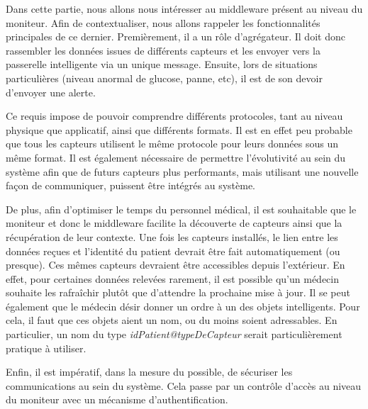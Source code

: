 Dans cette partie, nous allons nous intéresser au middleware présent au niveau du moniteur. Afin de contextualiser, nous allons
rappeler les fonctionnalités principales de ce dernier. Premièrement, il a un rôle d'agrégateur. Il doit donc rassembler les
données issues de différents capteurs et les envoyer vers la passerelle intelligente via un unique message. Ensuite, lors de
situations particulières (niveau anormal de glucose, panne, etc), il est de son devoir d'envoyer une alerte. 
\newline

Ce requis impose de pouvoir comprendre différents protocoles, tant au niveau physique que applicatif, ainsi que différents
formats. Il est en effet peu probable que tous les capteurs utilisent le même protocole pour leurs données sous un même format. Il
est également nécessaire de permettre l'évolutivité au sein du système afin que de futurs capteurs plus performants, mais
utilisant une nouvelle façon de communiquer, puissent être intégrés au système.
\newline

De plus, afin d'optimiser le temps du personnel médical, il est souhaitable que le moniteur et donc le middleware facilite la
découverte de capteurs ainsi que la récupération de leur contexte. Une fois les capteurs installés, le lien entre les données
reçues et l'identité du patient devrait être fait automatiquement (ou presque). Ces mêmes capteurs devraient être accessibles
depuis l'extérieur. En effet, pour certaines données relevées rarement, il est possible qu'un médecin souhaite les rafraîchir
plutôt que d'attendre la prochaine mise à jour. Il se peut également que le médecin désir donner un ordre à un des objets
intelligents. Pour cela, il faut que ces objets aient un nom, ou du moins soient adressables. En particulier, un nom du type
\textit{idPatient@typeDeCapteur} serait particulièrement pratique à utiliser.
\newline

Enfin, il est impératif, dans la mesure du possible, de sécuriser les communications au sein du système. Cela passe par un
contrôle d'accès au niveau du moniteur avec un mécanisme d'authentification.

